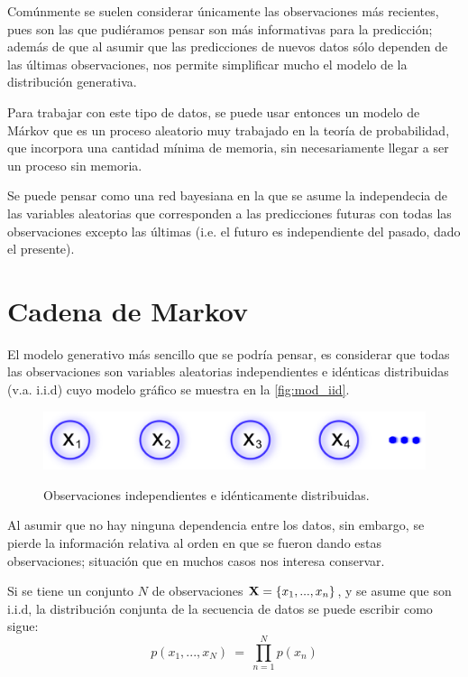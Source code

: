 Comúnmente se suelen considerar únicamente las observaciones más recientes, pues son las que pudiéramos pensar son más informativas para la predicción; además de que al asumir que las predicciones de nuevos datos sólo dependen de las últimas observaciones, nos permite simplificar mucho el modelo de la distribución generativa.

Para trabajar con este tipo de datos, se puede usar entonces un modelo de Márkov que es un proceso aleatorio muy trabajado en la teoría de probabilidad, que incorpora una cantidad mínima de memoria, sin necesariamente llegar a ser un proceso sin memoria.

Se puede pensar como una red bayesiana en la que se asume la independecia de las variables aleatorias que corresponden a las predicciones futuras con todas las observaciones excepto las últimas (i.e. el futuro es independiente del pasado, dado el presente).

\section{Cadena de Markov}


El modelo generativo más sencillo que se podría pensar, es considerar que todas las observaciones son variables aleatorias independientes e idénticas distribuidas (v.a. i.i.d) cuyo modelo gráfico se muestra en la \autoref{fig:mod_iid}.

\begin{figure}[bt]
        \myfloatalign
        {\includegraphics[width=0.6\linewidth]{gfx/chap2/mod-iid}}        
        \caption{Observaciones independientes e idénticamente distribuidas.}
        \label{fig:mod_iid}
\end{figure}

Al asumir que no hay ninguna dependencia entre los datos, sin embargo, se pierde la información relativa al orden en que se fueron dando estas observaciones; situación que en muchos casos nos interesa conservar.

Si se tiene un conjunto $N$ de observaciones $\textbf{X} = \lbrace x_1, ..., x_n \rbrace$, y se asume que son i.i.d, la distribución conjunta de la secuencia de datos se puede escribir como sigue:
\begin{equation}
\label{eqn:2-1}
p(x_1, ..., x_N) ~=~ \prod_{n=1}^N p(x_n)
\end{equation}

